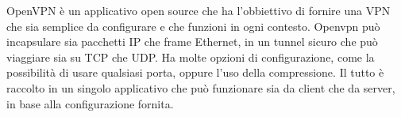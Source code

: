 OpenVPN è un applicativo open source che ha l'obbiettivo di fornire una VPN che sia semplice da configurare e che funzioni in ogni contesto. Openvpn può incapsulare sia pacchetti IP che frame Ethernet, in un tunnel sicuro che può viaggiare sia su TCP che UDP. Ha molte opzioni di configurazione, come la possibilità di usare qualsiasi porta, oppure l'uso della compressione. Il tutto è raccolto in un singolo applicativo che può funzionare sia da client che da server, in base alla configurazione fornita.

